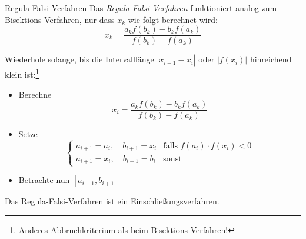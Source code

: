 \begin{defi}{Regula-Falsi-Verfahren}
    Das \emph{Regula-Falsi-Verfahren} funktioniert analog zum Bisektions-Verfahren, nur dass $x_k$ wie folgt berechnet wird:
    \[
        x_k = \frac{a_k f(b_k) - b_k f(a_k)}{f(b_k) - f(a_k)}
    \]
    
    Wiederhole solange, bis die Intervalllänge $|x_{i+1} - x_i|$ oder $|f(x_i)|$ hinreichend klein ist:\footnote{Anderes Abbruchkriterium als beim Bisektions-Verfahren!}
    \begin{itemize}
        \item Berechne
              \[
                  x_{i} = \frac{a_k f(b_k) - b_k f(a_k)}{f(b_k) - f(a_k)}
              \]
        \item Setze
              \[
                  \begin{cases}
                      a_{i+1} = a_{i}, \quad b_{i+1} = x_{i} & \text{falls } f(a_{i}) \cdot f(x_{i}) < 0 \\
                      a_{i+1} = x_{i}, \quad b_{i+1} = b_{i} & \text{sonst}
                  \end{cases}
              \]
        \item Betrachte nun $[a_{i+1}, b_{i+1}]$
    \end{itemize}
    
    Das Regula-Falsi-Verfahren ist ein Einschließungsverfahren.
\end{defi}

